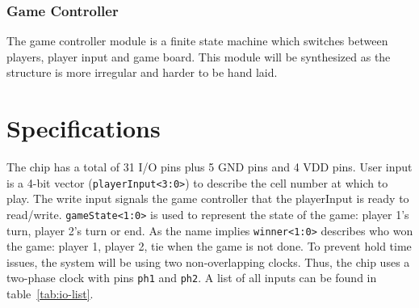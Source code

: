 \documentclass[]{article}
\begin{document}
\subsubsection{Game Controller}
The game controller module is a finite state machine which switches between players, player input and game board. This module will be synthesized as the structure is more irregular and harder to be hand laid.



\section{Specifications}
\label{specifications}
The chip has a total of 31 I/O pins plus 5 GND pins and 4 VDD pins.
User input is a 4-bit vector (\texttt{playerInput<3:0>}) to describe the cell number at which to play. The write input signals the game controller that the playerInput is ready to read/write. \texttt{gameState<1:0>} is used to represent the state of the game: player 1's turn, player 2's turn or end. As the name implies \texttt{winner<1:0>} describes who won the game: player 1, player 2, tie when the game is not done. To prevent hold time issues, the system will be using two non-overlapping clocks. Thus, the chip uses a two-phase clock with pins \texttt{ph1} and \texttt{ph2}. A list of all inputs can be found in table~\ref{tab:io-list}.
\end{document}
